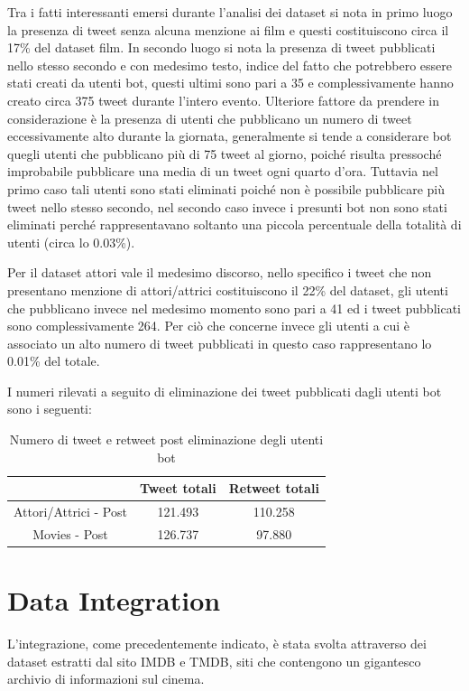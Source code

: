 \documentclass[11pt,a4paper]{report}
\begin{document}
Tra i fatti interessanti emersi durante l'analisi dei dataset si nota in primo luogo la presenza di tweet senza alcuna menzione ai film e questi costituiscono circa il 17\% del dataset film. In secondo luogo si nota la presenza di tweet pubblicati nello stesso secondo e con medesimo testo, indice del fatto che potrebbero essere stati creati da utenti bot, questi ultimi sono pari a 35 e complessivamente hanno creato circa 375 tweet durante l'intero evento. Ulteriore fattore da prendere in considerazione è la presenza di utenti che pubblicano un numero di tweet eccessivamente alto durante la giornata, generalmente si tende a considerare bot quegli utenti che pubblicano più di 75 tweet al giorno, poiché risulta pressoché improbabile pubblicare una media di un tweet ogni quarto d'ora. Tuttavia nel primo caso tali utenti sono stati eliminati poiché non è possibile pubblicare più tweet nello stesso secondo, nel secondo caso invece i presunti bot non sono stati eliminati perché rappresentavano soltanto una piccola percentuale della totalità di utenti (circa lo 0.03\%). 

Per il dataset attori vale il medesimo discorso, nello specifico i tweet che non presentano menzione di attori/attrici costituiscono il 22\% del dataset, gli utenti che pubblicano invece nel medesimo momento sono pari a 41 ed i tweet pubblicati sono complessivamente 264. Per ciò che concerne invece gli utenti a cui è associato un alto numero di tweet pubblicati in questo caso rappresentano lo 0.01\% del totale. 

I numeri rilevati a seguito di eliminazione dei tweet pubblicati dagli utenti bot sono i seguenti: 
\begin{table}[h]
	\begin{center}
	\begin{tabular}{ccc}
		\toprule
		          & Tweet totali & Retweet totali \\
		\midrule
	Attori/Attrici - Post & 121.493 & 110.258  \\
	Movies - Post & 126.737 & 97.880 \\
	\end{tabular}
	\caption{Numero di tweet e retweet post eliminazione degli utenti bot}
	\label{descrittiva}  
		\end{center} 
\end{table}

\chapter{Data Integration}
L'integrazione, come precedentemente indicato, è stata svolta attraverso dei dataset estratti dal sito IMDB e TMDB, siti che contengono un gigantesco archivio di informazioni sul cinema.
\end{document}
